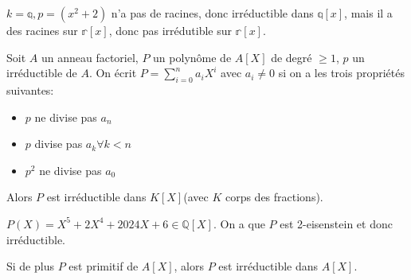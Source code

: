 \begin{exemple}
    $k = \mathbb{q}, p = (x^2 + 2 )$ n'a pas de racines, donc irréductible dans $\mathbb{q}[x]$, mais il a des racines sur $\mathbb{r}[x]$, donc pas irrédutible sur $\mathbb{r}[x]$.
\end{exemple}


\begin{theorem}
    Soit $A$ un anneau factoriel, $P$ un polynôme  de $A[X]$ de degré $\geq 1$, $p$ un irréductible de $A$.
    On écrit $P = \sum_{i=0}^n a_iX^i$ avec $a_i \neq 0$ si on a les trois propriétés suivantes: 
    \begin{itemize}
        \item $p$ ne divise pas $a_n$
        \item $p$ divise pas $a_k \forall k < n$
        \item $p^2$ ne divise pas $a_0$
    \end{itemize}
    Alors $P$ est irréductible dans $K[X]$(avec $K$ corps des fractions).
\end{theorem}

\begin{exemple}
    $P(X) = X^5 + 2X^4 + 2024X + 6\in \mathbb{Q}[X]$. On a que $P$ est 2-eisenstein et donc irréductible.
\end{exemple}



\begin{coro}
    Si de plus $P$ est primitif de $A[X]$, alors $P$ est irréductible dans $A[X]$.
\end{coro}
